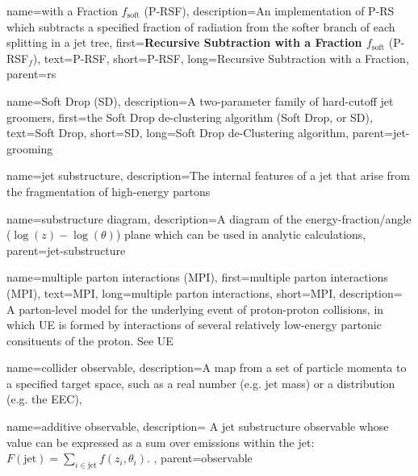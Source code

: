     {
        name=with a Fraction \(f_\text{soft}\) (P-RSF),
        description={An implementation of P-RS which subtracts a specified fraction of radiation from the softer branch of each splitting in a jet tree},
        first={\textbf{Recursive Subtraction with a Fraction \(f_\text{soft}\)} (P-RSF\(_f\))},
        text={P-RSF},
        short={P-RSF},
        long={Recursive Subtraction with a Fraction},
        parent=rs
    }


    {
        name=Soft Drop (SD),
        description={A two-parameter family of hard-cutoff jet groomers},
        first={the Soft Drop de-clustering algorithm (Soft Drop, or SD)},
        text={Soft Drop},
        short={SD},
        long={Soft Drop de-Clustering algorithm},
        parent=jet-grooming
    }



{
  name=jet substructure,
  description={The internal features of a jet that arise from the fragmentation of high-energy partons}
}

    {
      name=substructure diagram,
      description={A diagram of the energy-fraction/angle (\(\log(z)-\log(\theta)\)) plane which can be used in analytic calculations},
      parent=jet-substructure
    }




{
  name=multiple parton interactions (MPI),
  first=multiple parton interactions (MPI),
  text=MPI,
  long=multiple parton interactions,
  short=MPI,
  description={
      A parton-level model for the underlying event of proton-proton collisions, in which UE is formed by interactions of several relatively low-energy partonic consituents of the proton.
      See UE
    }
}


{
    name=collider observable,
    description={A map from a set of particle momenta to a specified target space, such as a real number (e.g. jet mass) or a distribution (e.g. the EEC)},
}

    {
        name=additive observable,
        description={
            A jet substructure observable whose value can be expressed as a sum over emissions within the jet:
            \(F(\text{jet}) = \sum_{i \in \text{jet}} f(z_i, \theta_i)\).
        },
        parent=observable
    }


